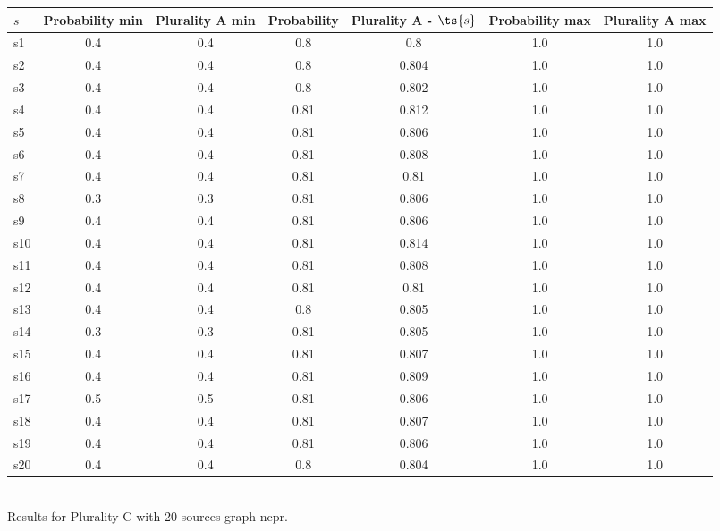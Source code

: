 \documentclass{article}
\begin{document}
\noindent\begin{tabular}{|l|c|c|c|c|c|c|}
\hline
$s$& Probability min & Plurality A min & Probability & Plurality A - $\ts{s}$ & Probability max & Plurality A max\\
\hline
s1 &0.4 & 0.4 & 0.8 & 0.8 & 1.0 & 1.0\\
\hline
s2 &0.4 & 0.4 & 0.8 & 0.804 & 1.0 & 1.0\\
\hline
s3 &0.4 & 0.4 & 0.8 & 0.802 & 1.0 & 1.0\\
\hline
s4 &0.4 & 0.4 & 0.81 & 0.812 & 1.0 & 1.0\\
\hline
s5 &0.4 & 0.4 & 0.81 & 0.806 & 1.0 & 1.0\\
\hline
s6 &0.4 & 0.4 & 0.81 & 0.808 & 1.0 & 1.0\\
\hline
s7 &0.4 & 0.4 & 0.81 & 0.81 & 1.0 & 1.0\\
\hline
s8 &0.3 & 0.3 & 0.81 & 0.806 & 1.0 & 1.0\\
\hline
s9 &0.4 & 0.4 & 0.81 & 0.806 & 1.0 & 1.0\\
\hline
s10 &0.4 & 0.4 & 0.81 & 0.814 & 1.0 & 1.0\\
\hline
s11 &0.4 & 0.4 & 0.81 & 0.808 & 1.0 & 1.0\\
\hline
s12 &0.4 & 0.4 & 0.81 & 0.81 & 1.0 & 1.0\\
\hline
s13 &0.4 & 0.4 & 0.8 & 0.805 & 1.0 & 1.0\\
\hline
s14 &0.3 & 0.3 & 0.81 & 0.805 & 1.0 & 1.0\\
\hline
s15 &0.4 & 0.4 & 0.81 & 0.807 & 1.0 & 1.0\\
\hline
s16 &0.4 & 0.4 & 0.81 & 0.809 & 1.0 & 1.0\\
\hline
s17 &0.5 & 0.5 & 0.81 & 0.806 & 1.0 & 1.0\\
\hline
s18 &0.4 & 0.4 & 0.81 & 0.807 & 1.0 & 1.0\\
\hline
s19 &0.4 & 0.4 & 0.81 & 0.806 & 1.0 & 1.0\\
\hline
s20 &0.4 & 0.4 & 0.8 & 0.804 & 1.0 & 1.0\\
\hline
\end{tabular}\\

\noindent Results for Plurality C with 20 sources graph ncpr.
\end{document}

